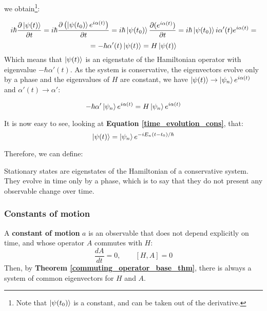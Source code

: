 we obtain\footnote{Note that $\ket{\psi(t_0)}$ is a constant, and can be taken out of the derivative.}:

\begin{equation*}
    i\hbar \frac{\partial \ket{\psi(t)}}{\partial t} = i \hbar \frac{\partial \left(\ket{\psi(t_0)}e^{i\alpha(t)}\right)}{\partial t} = i\hbar \ket{\psi(t_0)} \frac{\partial (e^{i\alpha(t)})}{\partial t} = i\hbar \ket{\psi(t_0)} i \alpha'(t)e^{i\alpha(t)} = 
\end{equation*}
\begin{equation}
    = -\hbar \alpha'(t)\ket{\psi(t)} = H \ket{\psi(t)}
\end{equation}
Which means that $\ket{\psi(t)}$ is an eigenstate of the Hamiltonian operator with eigenvalue $-\hbar \alpha'(t)$. As the system is conservative, the eigenvectors evolve only by a phase and the eigenvalues of $H$ are constant, we have $\ket{\psi(t)}\to\ket{\psi_n}e^{i\alpha(t)}$ and $\alpha'(t)\to \alpha'$:

\begin{equation}
    -\hbar \alpha'\ket{\psi_n}e^{i\alpha(t)} = H \ket{\psi_n}e^{i\alpha(t)}
\end{equation}

It is now easy to see, looking at \textbf{Equation \ref{time_evolution_cons}}, that:
\begin{equation}
    \ket{\psi(t)} = \ket{\psi_n}e^{-iE_n(t-t_0)/\hbar}
\end{equation}

Therefore, we can define:

\begin{definition}
    Stationary states are eigenstates of the Hamiltonian of a conservative system. They evolve in time only by a phase, which is to say that they do not present any observable change over time.
\end{definition}

\subsubsection{Constants of motion}

A \textbf{constant of motion} $a$ is an observable that does not depend explicitly on time, and whose operator $A$ commutes with $H$:
\begin{equation}
    \frac{dA}{dt} = 0,\qquad [H,A] = 0
\end{equation}
Then, by \textbf{Theorem \ref{commuting_operator_base_thm}}, there is always a system of common eigenvectors for $H$ and $A$.